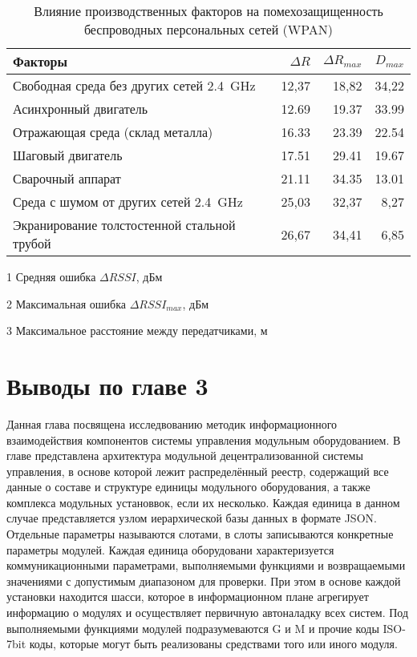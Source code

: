 \begin{table}[!htb]
\centering
\caption{Влияние производственных факторов на помехозащищенность беспроводных персональных сетей (WPAN)} \vspace{4pt}
\label{tab-2}
\begin{threeparttable}
\begin{tabularx}{\linewidth}{@{} lrrr}
	\toprule
	\textbf{Факторы} &
	{\small $\Delta R$} \tnote{1} &
	{\small $\Delta R_{max}$} \tnote{2} &
	{\small $D_{max}$} \tnote{3} \\
	\midrule
	Свободная среда без других сетей \SI{2,4}{\giga\hertz} & 12,37 & 18,82 & 34,22 \\
	Асинхронный двигатель & 12.69 & 19.37 & 33.99 \\
	Отражающая среда (склад металла) & 16.33 & 23.39 & 22.54 \\
	Шаговый двигатель & 17.51 & 29.41 & 19.67 \\
	Сварочный аппарат & 21.11 & 34.35 & 13.01 \\
	Среда с шумом от других сетей \SI{2,4}{\giga\hertz} & 25,03 & 32,37 & 8,27 \\
	Экранирование толстостенной стальной трубой & 26,67 & 34,41 & 6,85 \\
	\bottomrule
\end{tabularx}
\begin{tablenotes} \footnotesize
	\item [1] Средняя ошибка $\Delta RSSI$, дБм
	\item [2] Максимальная ошибка $\Delta RSSI_{max}$, дБм
	\item [3] Максимальное расстояние между передатчиками, м
\end{tablenotes}
\end{threeparttable}
\end{table}

\section{Выводы по главе 3}

Данная глава посвящена исследвованию методик информационного взаимодействия компонентов системы управления модульным оборудованием. В главе представлена архитектура модульной децентрализованной системы управления, в основе которой лежит распределённый реестр, содержащий все данные о составе и структуре единицы модульного оборудования, а также комплекса модульных установвок, если их несколько. Каждая единица в данном случае представляется узлом иерархической базы данных в формате JSON. Отдельные параметры называются слотами, в слоты записываются конкретные параметры модулей. Каждая единица оборудовани характеризуется коммуникационными параметрами, выполняемыми функциями и возвращаемыми значениями с допустимым диапазоном для проверки. При этом в основе каждой установки находится шасси, которое в информационном плане агрегирует информацию о модулях и осуществляет первичную автоналадку всех систем. Под выполняемыми функциями модулей подразумеваются G и M и прочие коды ISO-7bit коды, которые могут быть реализованы средствами того или иного модуля. 

